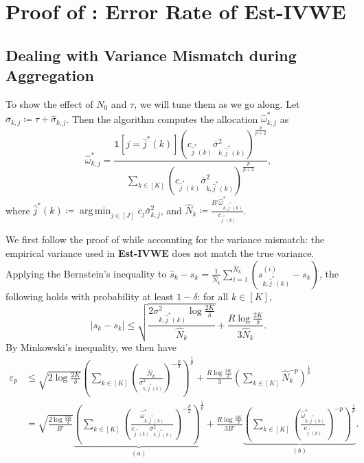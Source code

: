 \documentclass{article}
\DeclareMathOperator*{\argmin}{arg\,min}
\theoremstyle{plain}
\theoremstyle{definition}
\theoremstyle{plain}
\newcommand{\indicator}{\mathds{1}}
\begin{document}
\newpage
\section{\texorpdfstring{Proof of : Error Rate of \textbf{Est-IVWE}}{Proof of Theorem 4.1: Error Rate of \textbf{Est-IVWE}}}
\label{app:upper-bound-unknown}

\subsection{Dealing with Variance Mismatch during Aggregation}
To show the effect of $N_0$ and $\tau$, we will tune them as we go along.
Let $\overline{\sigma}_{k,j} \coloneq \tau + \hat{\sigma}_{k,j}$.
Then the algorithm computes the allocation $\widehat{\omega}_{k,j}^*$ as
\begin{equation}
    \widehat{\omega}_{k,j}^* = \frac{\indicator[j = \hat{j}^*(k)] \left( c_{\hat{j}^*(k)} \overline{\sigma}_{k,\hat{j}^*(k)}^2 \right)^{\frac{p}{p+2}}}{\sum_{k\in[K]} \left( c_{\hat{j}^*(k)} \overline{\sigma}_{k,\hat{j}^*(k)}^2 \right)^{\frac{p}{p+2}}},
\end{equation}
where $\hat{j}^*(k) \coloneq \argmin_{j \in [J]} c_j \overline{\sigma}_{k,j}^2$, and $\widehat{N}_k \coloneq \frac{B' \widehat{\omega}_{k,\hat{j}^*(k)}^*}{c_{\hat{j}^*(k)}}$.

We first follow the proof of  while accounting for the variance mismatch: the empirical variance used in \textbf{Est-IVWE} does not match the true variance.
Applying the Bernstein's inequality to $\hat{s}_k - s_k = \frac{1}{\widehat{N}_k} \sum_{i=1}^{\widehat{N}_k} \left( s_{k,\hat{j}^*(k)}^{(i)} - s_k \right)$, the following holds with probability at least $1 - \delta$: for all $k \in [K]$,
\begin{equation}
    |\hat{s}_k - s_k| \leq \sqrt{\frac{2 \sigma_{k,\hat{j}^*(k)}^2 \log\frac{2K}{\delta}}{\widehat{N}_k}} + \frac{R \log\frac{2K}{\delta}}{3 \widehat{N}_k}.
\end{equation}
By Minkowski's inequality, we then have
\begin{align}
    \varepsilon_p &\leq \sqrt{2 \log\frac{2K}{\delta}} \left( \sum_{k \in [K]} \left( \frac{\widehat{N}_k}{\sigma_{k,\hat{j}^*(k)}^2} \right)^{-\frac{p}{2}} \right)^{\frac{1}{p}} + \frac{R \log\frac{2K}{\delta}}{3} \left( \sum_{k \in [K]} \widehat{N}_k^{-p} \right)^{\frac{1}{p}} \\
    &= \sqrt{\frac{2 \log\frac{2K}{\delta}}{B'}} \underbrace{\left( \sum_{k \in [K]} \left( \frac{\widehat{\omega}_{k,\hat{j}^*(k)}^*}{c_{\hat{j}^*(k)} \sigma_{k,\hat{j}^*(k)}^2} \right)^{-\frac{p}{2}} \right)^{\frac{1}{p}}}_{(a)} + \frac{R \log\frac{2K}{\delta}}{3 B'} \underbrace{\left( \sum_{k \in [K]} \left( \frac{\widehat{\omega}_{k,\hat{j}^*(k)}^*}{c_{\hat{j}^*(k)}} \right)^{-p} \right)^{\frac{1}{p}}}_{(b)}.
\end{align}
\end{document}
